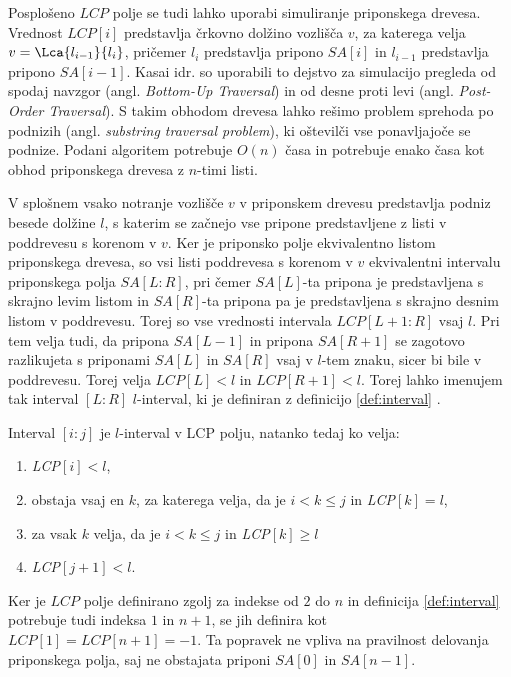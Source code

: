 Posplošeno $LCP$ polje se tudi lahko uporabi simuliranje priponskega drevesa. Vrednost $LCP[i]$ predstavlja črkovno dolžino vozlišča $v$, za katerega velja $v=\Lca{l_{i-1}}{l_i}$, pričemer $l_i$ predstavlja pripono $SA[i]$ in $l_{i-1}$ predstavlja pripono $SA[i-1]$. Kasai idr. \cite{Kasai2001} so uporabili to dejstvo za simulacijo pregleda od spodaj navzgor (angl. \textit{Bottom-Up Traversal}) in od desne proti levi (angl. \textit{Post-Order Traversal}). S takim obhodom drevesa lahko rešimo problem sprehoda po podnizih (angl. \textit{substring traversal problem}), ki oštevilči vse ponavljajoče se podnize. Podani algoritem potrebuje $O(n)$ časa in potrebuje enako časa kot obhod priponskega drevesa z $n$-timi listi.

V splošnem vsako notranje vozlišče $v$ v priponskem drevesu predstavlja podniz besede dolžine $l$, s katerim se začnejo vse pripone predstavljene z listi v poddrevesu s korenom v $v$. Ker je priponsko polje ekvivalentno listom priponskega drevesa, so vsi listi poddrevesa s korenom v $v$ ekvivalentni intervalu priponskega polja $SA[L:R]$, pri čemer $SA[L]$-ta pripona je predstavljena s skrajno levim listom in $SA[R]$-ta pripona pa je predstavljena s skrajno desnim listom v poddrevesu. Torej so vse vrednosti intervala $LCP[L+1:R]$ vsaj $l$. Pri tem velja tudi, da pripona $SA[L-1]$ in pripona $SA[R+1]$ se zagotovo razlikujeta s priponami $SA[L]$ in $SA[R]$ vsaj v $l$-tem znaku, sicer bi bile v poddrevesu. Torej velja $LCP[L]< l$ in $LCP[R+1]< l$. Torej lahko imenujem tak interval $[L:R]$ $l$-interval, ki je definiran z definicijo \ref{def:interval} \cite{Abouelhoda2004}.

\begin{defi}\label{def:interval}
    Interval $[i:j]$ je $l$-interval v LCP polju, natanko tedaj ko velja:
    \begin{enumerate}
        \item \textit{LCP}$[i]<l$,
        \item obstaja vsaj en $k$, za katerega velja, da je $i< k\le j$ in \textit{LCP}$[k]=l$,
        \item za vsak $k$ velja, da je $i< k\le j$ in \textit{LCP}$[k]\ge l$
        \item \textit{LCP}$[j+1]<l$.      
    \end{enumerate}
\end{defi}

Ker je $LCP$ polje definirano zgolj za indekse od $2$ do $n$ in definicija \ref{def:interval} potrebuje tudi indeksa $1$ in $n+1$, se jih definira kot $LCP[1]=LCP[n+1]=-1$. Ta popravek ne vpliva na pravilnost delovanja priponskega polja, saj ne obstajata priponi $SA[0]$ in $SA[n-1]$. 

